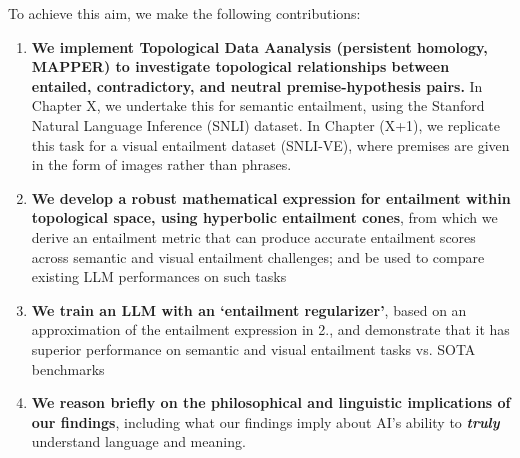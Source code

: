 \documentclass[12pt,twoside]{report}
\begin{document}
To achieve this aim, we make the following contributions: 

\begin{enumerate}[itemsep=0pt]
    \item \textbf{We implement Topological Data Aanalysis (persistent homology, MAPPER) to investigate topological relationships between entailed, contradictory, and neutral premise-hypothesis pairs.} In Chapter X, we undertake this for semantic entailment, using the Stanford Natural Language Inference (SNLI) dataset. In Chapter (X+1), we replicate this task for a visual entailment dataset (SNLI-VE), where premises are given in the form of images rather than phrases.
    \item \textbf{We develop a robust mathematical expression for entailment within topological space, using hyperbolic entailment cones}, from which we derive an entailment metric that can produce accurate entailment scores across semantic and visual entailment challenges; and be used to compare existing LLM performances on such tasks
    \item \textbf{We train an LLM with an `entailment regularizer'}, based on an approximation of the entailment expression in 2., and demonstrate that it has superior performance on semantic and visual entailment tasks vs. SOTA benchmarks 
    \item \textbf{We reason briefly on the philosophical and linguistic implications of our findings}, including what our findings imply about AI's ability to \textbf{\textit{truly}} understand language and meaning. 
\end{enumerate}
\end{document}
